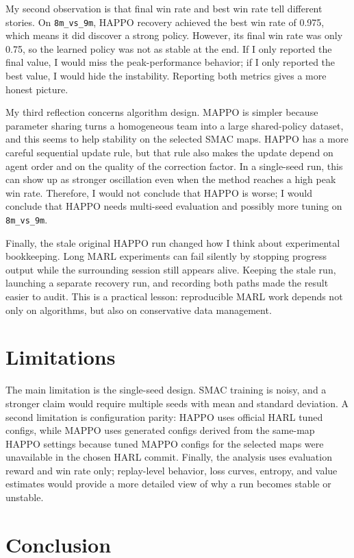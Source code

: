 \documentclass{article}
\begin{document}
My second observation is that final win rate and best win rate tell different stories. On \texttt{8m\_vs\_9m}, HAPPO recovery achieved the best win rate of 0.975, which means it did discover a strong policy. However, its final win rate was only 0.75, so the learned policy was not as stable at the end. If I only reported the final value, I would miss the peak-performance behavior; if I only reported the best value, I would hide the instability. Reporting both metrics gives a more honest picture.

My third reflection concerns algorithm design. MAPPO is simpler because parameter sharing turns a homogeneous team into a large shared-policy dataset, and this seems to help stability on the selected SMAC maps. HAPPO has a more careful sequential update rule, but that rule also makes the update depend on agent order and on the quality of the correction factor. In a single-seed run, this can show up as stronger oscillation even when the method reaches a high peak win rate. Therefore, I would not conclude that HAPPO is worse; I would conclude that HAPPO needs multi-seed evaluation and possibly more tuning on \texttt{8m\_vs\_9m}.

Finally, the stale original HAPPO run changed how I think about experimental bookkeeping. Long MARL experiments can fail silently by stopping progress output while the surrounding session still appears alive. Keeping the stale run, launching a separate recovery run, and recording both paths made the result easier to audit. This is a practical lesson: reproducible MARL work depends not only on algorithms, but also on conservative data management.

\section{Limitations}

The main limitation is the single-seed design. SMAC training is noisy, and a stronger claim would require multiple seeds with mean and standard deviation. A second limitation is configuration parity: HAPPO uses official HARL tuned configs, while MAPPO uses generated configs derived from the same-map HAPPO settings because tuned MAPPO configs for the selected maps were unavailable in the chosen HARL commit. Finally, the analysis uses evaluation reward and win rate only; replay-level behavior, loss curves, entropy, and value estimates would provide a more detailed view of why a run becomes stable or unstable.

\section{Conclusion}
\end{document}
